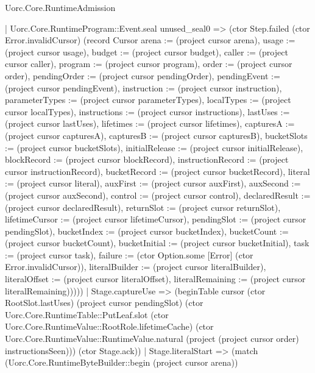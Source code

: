 \begin{lexlean}{Uorc.Core.RuntimeAdmission}
\begin{semanticmodule}
{          | Uorc.Core.RuntimeProgram::Event.seal unused_seal0 => (ctor Step.failed (ctor Error.invalidCursor) (record Cursor {arena := (project cursor arena), usage := (project cursor usage), budget := (project cursor budget), caller := (project cursor caller), program := (project cursor program), order := (project cursor order), pendingOrder := (project cursor pendingOrder), pendingEvent := (project cursor pendingEvent), instruction := (project cursor instruction), parameterTypes := (project cursor parameterTypes), localTypes := (project cursor localTypes), instructions := (project cursor instructions), lastUses := (project cursor lastUses), lifetimes := (project cursor lifetimes), capturesA := (project cursor capturesA), capturesB := (project cursor capturesB), bucketSlots := (project cursor bucketSlots), initialRelease := (project cursor initialRelease), blockRecord := (project cursor blockRecord), instructionRecord := (project cursor instructionRecord), bucketRecord := (project cursor bucketRecord), literal := (project cursor literal), auxFirst := (project cursor auxFirst), auxSecond := (project cursor auxSecond), control := (project cursor control), declaredResult := (project cursor declaredResult), returnSlot := (project cursor returnSlot), lifetimeCursor := (project cursor lifetimeCursor), pendingSlot := (project cursor pendingSlot), bucketIndex := (project cursor bucketIndex), bucketCount := (project cursor bucketCount), bucketInitial := (project cursor bucketInitial), task := (project cursor task), failure := (ctor Option.some [Error] (ctor Error.invalidCursor)), literalBuilder := (project cursor literalBuilder), literalOffset := (project cursor literalOffset), literalRemaining := (project cursor literalRemaining)}))))
      | Stage.captureUse => (beginTable cursor (ctor RootSlot.lastUses) (project cursor pendingSlot) (ctor Uorc.Core.RuntimeTable::PutLeaf.slot (ctor Uorc.Core.RuntimeValue::RootRole.lifetimeCache) (ctor Uorc.Core.RuntimeValue::RuntimeValue.natural (project (project cursor order) instructionsSeen))) (ctor Stage.ack))
      | Stage.literalStart => (match (Uorc.Core.RuntimeByteBuilder::begin (project cursor arena))
}
\end{semanticmodule}
\end{lexlean}
